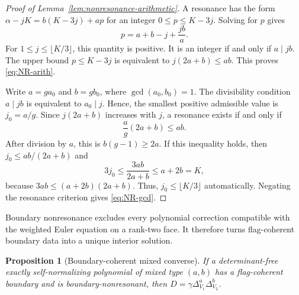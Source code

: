 \documentclass[12pt,a4paper]{article}
\theoremstyle{plain}
\newtheorem{proposition}{Proposition}
\theoremstyle{definition}
\begin{document}
\begin{proof}[Proof of Lemma~\ref{lem:nonresonance-arithmetic}]
    A resonance has the form $\alpha-jK=b(K-3j)+ap$ for an integer $0\le p\le K-3j$.
    Solving for $p$ gives
    \begin{equation*}
        p=a+b-j+\frac{jb}{a}
        .
    \end{equation*}
    For $1\le j\le\lfloor K/3\rfloor$, this quantity is positive.
    It is an integer if and only if $a\mid jb$.
    The upper bound $p\le K-3j$ is equivalent to $j(2a+b)\le ab$.
    This proves \eqref{eq:NR-arith}.

    Write $a=ga_0$ and $b=gb_0$, where $\gcd(a_0,b_0)=1$.
    The divisibility condition $a\mid jb$ is equivalent to $a_0\mid j$.
    Hence, the smallest positive admissible value is $j_0=a/g$.
    Since $j(2a+b)$ increases with $j$, a resonance exists if and only if
    \begin{equation*}
        \frac{a}{g}(2a+b)\le ab
        .
    \end{equation*}
    After division by $a$, this is $b(g-1)\ge2a$.
    If this inequality holds, then $j_0\le ab/(2a+b)$ and
    \begin{equation*}
        3j_0\le\frac{3ab}{2a+b}\le a+2b=K
        ,
    \end{equation*}
    because $3ab\le(a+2b)(2a+b)$.
    Thus, $j_0\le\lfloor K/3\rfloor$ automatically.
    Negating the resonance criterion gives \eqref{eq:NR-gcd}.
\end{proof}

Boundary nonresonance excludes every polynomial correction compatible with the weighted Euler equation on a rank-two face.
It therefore turns flag-coherent boundary data into a unique interior solution.

\begin{proposition}[Boundary-coherent mixed converse]
\label{prop:boundary-rigidity}
    If a determinant-free exactly self-normalizing polynomial of mixed type $(a,b)$ has a flag-coherent boundary and is boundary-nonresonant, then $D=\gamma\Delta_{V_1}^a\Delta_{V_2}^b$.
\end{proposition}
\end{document}
